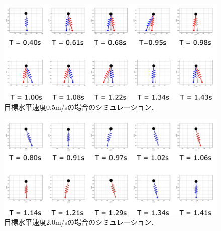 \begin{figure}[htbp]
 \centering
 \includegraphics[width = .85\linewidth, clip]{./fig/dx0_5_walking.png}
 \caption{目標水平速度0.5m/sの場合のシミュレーション．\label{dx05}}
\end{figure}
\begin{figure}[htbp]
 \centering
 \includegraphics[width = .85\linewidth, clip]{./fig/dx2_0_running.png}
 \caption{目標水平速度2.0m/sの場合のシミュレーション．\label{dx20}}
\end{figure}
